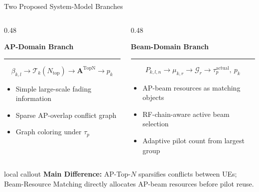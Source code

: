 \documentclass[aspectratio=169, 10pt]{beamer}
\newcommand{\tauactual}{\tau_p^{\mathrm{actual}}}
\newcommand{\slideheading}[1]{%
    \par\vspace{0.08cm}%
    \settowidth{\dimen0}{\bfseries\large #1}%
    {\bfseries\large #1}%
    \par\vspace{0.015cm}%
    {\color{black}\rule{\dimen0}{0.7pt}}%
    \par\vspace{0.16cm}%
}
\newcommand{\slidecallout}[2]{%
    \vspace{0.08cm}%
    \begin{beamercolorbox}[wd=\linewidth,sep=0.55ex,leftskip=0.8ex,rightskip=0.8ex,rounded=true]{local callout}
        \small{\color{ku_crimson}\bfseries #1:} #2
    \end{beamercolorbox}%
}
\begin{document}
\begin{frame}{Two Proposed System-Model Branches}
    \small
    \begin{columns}[T,onlytextwidth]
        \begin{column}{0.48\textwidth}
            \slideheading{AP-Domain Branch}
            \[
                \beta_{k,l}
                \rightarrow
                \mathcal{T}_k(N_{\mathrm{top}})
                \rightarrow
                \mathbf{A}^{\mathrm{TopN}}
                \rightarrow
                p_k
            \]
            \begin{itemize}
                \item Simple large-scale fading information
                \item Sparse AP-overlap conflict graph
                \item Graph coloring under \(\tau_p\)
            \end{itemize}
        \end{column}
        \begin{column}{0.48\textwidth}
            \slideheading{Beam-Domain Branch}
            \[
                P_{k,l,n}
                \rightarrow
                \mu_{k,r}
                \rightarrow
                \mathcal{G}_r
                \rightarrow
                \tauactual,\ p_k
            \]
            \begin{itemize}
                \item AP-beam resources as matching objects
                \item RF-chain-aware active beam selection
                \item Adaptive pilot count from largest group
            \end{itemize}
        \end{column}
    \end{columns}

    \slidecallout{Main Difference}{AP-Top-\(N\) sparsifies conflicts between UEs; Beam-Resource Matching directly allocates AP-beam resources before pilot reuse.}
\end{frame}

\end{document}
